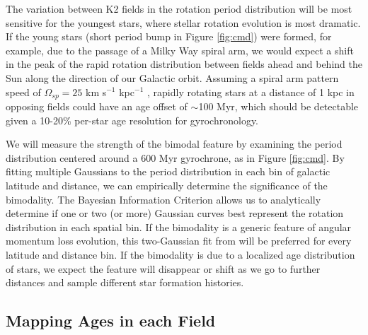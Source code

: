 \documentclass[12pt]{article}
\begin{document}
The variation between K2 fields in the rotation period distribution will be most sensitive for the youngest stars, where stellar rotation evolution is most dramatic. If the young stars (short period bump in Figure \ref{fig:cmd}) were formed, for example, due to the passage of a Milky Way spiral arm, we would expect a shift in the peak of the rapid rotation distribution between fields ahead and behind the Sun along the direction of our Galactic orbit. Assuming a spiral arm pattern speed of $\Omega_{sp}= 25$ km s$^{-1}$ kpc$^{-1}$ \citep{dias2005,gerhard2011}, rapidly rotating stars at a distance of 1 kpc in opposing fields could have an age offset of $\sim$100 Myr, which should be detectable given a 10-20\% per-star age resolution for gyrochronology.


We will measure the strength of the bimodal feature by examining the period
distribution centered around a 600 Myr gyrochrone, as in Figure \ref{fig:cmd}.
By fitting multiple Gaussians to the period distribution in each bin of
galactic latitude and distance, we can empirically determine the significance
of the bimodality. The Bayesian Information Criterion allows us to
analytically determine if one or two (or more) Gaussian curves best represent
the rotation distribution in each spatial bin. If the bimodality is a generic
feature of angular momentum loss evolution, this two-Gaussian fit from
\citet{davenport2017} will be preferred for every latitude and distance bin.
If the bimodality is due to a localized age distribution of stars, we expect
the feature will disappear or shift as we go to further distances and sample
different star formation histories. %




\subsection{Mapping Ages in each Field}


\end{document}
